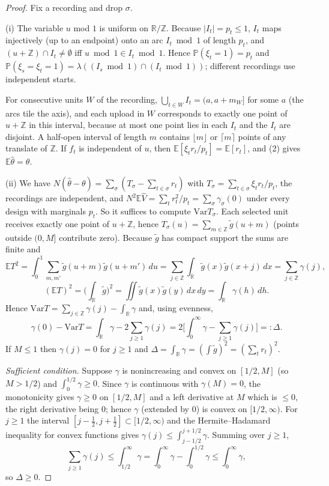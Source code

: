 \documentclass[11pt]{article}
\theoremstyle{remark}
\newcommand{\E}{\mathbb{E}}
\renewcommand{\Pr}{\mathbb{P}}
\newcommand{\Var}{\mathrm{Var}}
\newcommand{\hth}{\hat\theta}
\newcommand{\hV}{\hat V}
\begin{document}
\begin{proof}
Fix a recording and drop $\sigma$.

(i) The variable $u$ mod $1$ is uniform on $\mathbb R/\mathbb Z$. Because $|I_t|=p_t\le1$, $I_t$ maps injectively (up to an endpoint) onto an arc $I_t\bmod1$ of length $p_t$, and $(u+\mathbb Z)\cap I_t\ne\emptyset$ iff $u\bmod1\in I_t\bmod1$. Hence $\Pr(\xi_t=1)=p_t$ and $\Pr(\xi_s=\xi_t=1)=\lambda((I_s\bmod1)\cap(I_t\bmod1))$; different recordings use independent starts.

For consecutive units $W$ of the recording, $\bigcup_{t\in W}I_t=(a,a+m_W]$ for some $a$ (the arcs tile the axis), and each upload in $W$ corresponds to exactly one point of $u+\mathbb Z$ in this interval, because at most one point lies in each $I_t$ and the $I_t$ are disjoint. A half-open interval of length $m$ contains $\lfloor m\rfloor$ or $\lceil m\rceil$ points of any translate of $\mathbb Z$. If $f_t$ is independent of $u$, then $\E[\xi_tr_t/p_t]=\E[r_t]$, and (2) gives $\E\hth=\theta$.

(ii) We have $N(\hth-\theta)=\sum_\sigma(T_\sigma-\sum_{t\in\sigma}r_t)$ with $T_\sigma=\sum_{t\in\sigma}\xi_tr_t/p_t$, the recordings are independent, and $N^2\E\hV=\sum_tr_t^2/p_t=\sum_\sigma\gamma_\sigma(0)$ under every design with marginals $p_t$. So it suffices to compute $\Var T_\sigma$. Each selected unit receives exactly one point of $u+\mathbb Z$, hence $T_\sigma(u)=\sum_{m\in\mathbb Z}\tilde g(u+m)$ (points outside $(0,M]$ contribute zero). Because $\tilde g$ has compact support the sums are finite and
\[
\E T^2=\int_0^1\sum_{m,m'}\tilde g(u+m)\tilde g(u+m')\,du=\sum_{j\in\mathbb Z}\int_{\mathbb R}\tilde g(x)\tilde g(x+j)\,dx=\sum_{j\in\mathbb Z}\gamma(j),
\]
\[
(\E T)^2=\Big(\int_{\mathbb R}\tilde g\Big)^2=\iint\tilde g(x)\tilde g(y)\,dx\,dy=\int_{\mathbb R}\gamma(h)\,dh .
\]
Hence $\Var T=\sum_{j\in\mathbb Z}\gamma(j)-\int_{\mathbb R}\gamma$ and, using evenness,
\[
\gamma(0)-\Var T=\int_{\mathbb R}\gamma-2\sum_{j\ge1}\gamma(j)=2\Big[\int_0^\infty\gamma-\sum_{j\ge1}\gamma(j)\Big]=:\Delta .
\]
If $M\le1$ then $\gamma(j)=0$ for $j\ge1$ and $\Delta=\int_{\mathbb R}\gamma=(\int\tilde g)^2=(\sum_tr_t)^2$.

\emph{Sufficient condition.} Suppose $\gamma$ is nonincreasing and convex on $[1/2,M]$ (so $M>1/2$) and $\int_0^{1/2}\gamma\ge0$. Since $\gamma$ is continuous with $\gamma(M)=0$, the monotonicity gives $\gamma\ge0$ on $[1/2,M]$ and a left derivative at $M$ which is $\le0$, the right derivative being $0$; hence $\gamma$ (extended by $0$) is convex on $[1/2,\infty)$. For $j\ge1$ the interval $[j-\tfrac12,j+\tfrac12]\subset[1/2,\infty)$ and the Hermite--Hadamard inequality for convex functions gives $\gamma(j)\le\int_{j-1/2}^{j+1/2}\gamma$. Summing over $j\ge1$,
\[
\sum_{j\ge1}\gamma(j)\le\int_{1/2}^\infty\gamma=\int_0^\infty\gamma-\int_0^{1/2}\gamma\le\int_0^\infty\gamma ,
\]
so $\Delta\ge0$.


\end{proof}
\end{document}
